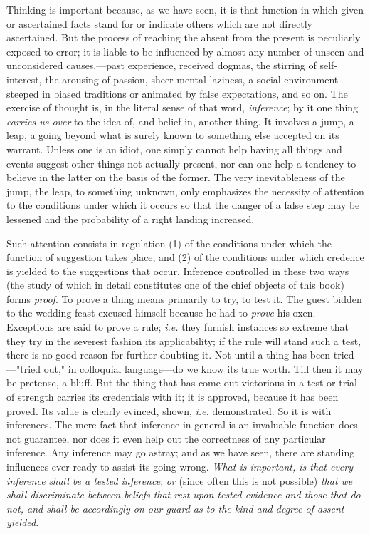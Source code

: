 \documentclass[letterpaper]{book}
\begin{document}
Thinking is important because, as we have seen, it is that function in
which given or ascertained facts stand for or indicate others which are
not directly ascertained. But the process of reaching the absent from
the present is peculiarly exposed to error; it is liable to be
influenced by almost any number of unseen and unconsidered
causes,---past experience, received dogmas, the stirring of
self-interest, the arousing of passion, sheer mental laziness, a social
environment steeped in biased traditions or animated by false
expectations, and so on. The exercise of thought is, in the literal
sense of that word, \emph{inference}; by it one thing \emph{carries us
over} to the idea of, and belief in, another thing. It involves a jump,
a leap, a going beyond what is surely known to something else accepted
on its warrant. Unless one is an idiot, one simply cannot help having
all things and events suggest other things not actually present, nor can
one help a tendency to believe in the latter on the basis of the former.
The very inevitableness of the jump, the leap, to something unknown,
only emphasizes the necessity of attention to the conditions under which
it occurs so that the danger of a false step may be lessened and the
probability of a right landing
increased.


Such attention consists in regulation (1) of the conditions under which
the function of suggestion takes place, and (2) of the conditions under
which credence is yielded to the suggestions that occur. Inference
controlled in these two ways (the study of which in detail constitutes
one of the chief objects of this book) forms \emph{proof}. To prove a
thing means primarily to try, to test it. The guest bidden to the
wedding feast excused himself because he had to \emph{prove} his oxen.
Exceptions are said to prove a rule; \emph{i.e.} they furnish instances
so extreme that they try in the severest fashion its applicability; if
the rule will stand such a test, there is no good reason for further
doubting it. Not until a thing has been tried---"tried out," in
colloquial language---do we know its true worth. Till then it may be
pretense, a bluff. But the thing that has come out victorious in a test
or trial of strength carries its credentials with it; it is approved,
because it has been proved. Its value is clearly evinced, shown,
\emph{i.e.} demonstrated. So it is with inferences. The mere fact that
inference in general is an invaluable function does not guarantee, nor
does it even help out the correctness of any particular inference. Any
inference may go astray; and as we have seen, there are standing
influences ever ready to assist its going wrong. \emph{What is
important, is that every inference shall be a tested inference};
\emph{or} (since often this is not possible) \emph{that we shall
discriminate between beliefs that rest upon tested evidence and those
that do not, and shall be accordingly on our guard as to the kind and
degree of assent yielded}.
\end{document}
